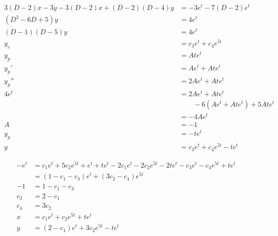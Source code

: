 \documentclass{article}
\begin{document}
\begin{align*}
  3 (D - 2) x - 3 y - 3 (D - 2) x + (D - 2) (D - 4) y & = -3 e^t - 7 (D - 2) e^t                 \\
  (D^2 - 6 D + 5) y                                   & = 4 e^t                                  \\
  (D - 1) (D - 5) y                                   & = 4 e^t                                  \\
  y_c                                                 & = c_3 e^t + c_4 e^{5 t}                  \\
  y_p                                                 & = A t e^t                                \\
  y_p'                                                & = A e^t + A t e^t                        \\
  y_p''                                               & = 2 A e^t + A t e^t                      \\
  4 e^t                                               & = 2 A e^t + A t e^t                      \\
                                                      & \qquad - 6 (A e^t + A t e^t) + 5 A t e^t \\
                                                      & = -4 A e^t                               \\
  A                                                   & = -1                                     \\
  y_p                                                 & = -t e^t                                 \\
  y                                                   & = c_3 e^t + c_4 e^{5 t} - t e^t
\end{align*}

\begin{align*}
  -e^t & = c_1 e^t + 5 c_2 e^{5 t} + e^t + t e^t - 2 c_1 e^t - 2 c_2 e^{5 t} - 2 t e^t - c_3 e^t - c_4 e^{5 t} + t e^t \\
       & = (1 - c_1 - c_3) e^t + (3 c_2 - c_4) e^{5 t}                                                                 \\
  -1   & = 1 - c_1 - c_3                                                                                               \\
  c_3  & = 2 - c_1                                                                                                     \\
  c_4  & = 3 c_2                                                                                                       \\
  x    & = c_1 e^t + c_2 e^{5 t} + t e^t                                                                               \\
  y    & = (2 - c_1) e^t + 3 c_2 e^{5 t} - t e^t
\end{align*}
\end{document}
